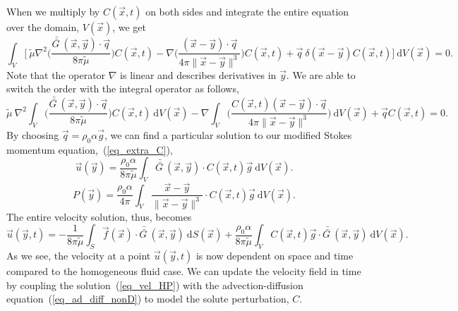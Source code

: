When we multiply by $ C(\vec{x},t) $ on both sides and integrate the entire equation over the domain, $V(\vec{x})$, we get
\begin{equation}
	\int_{V}
	\biggl[
	\ \tilde{\mu} \nabla^2 
	\biggl( \frac{ \bar{\bar{G \ }}(\vec{x}, \vec{y})
	\cdot  \vec{q}}{8\pi \tilde{\mu}}  \biggr)
	C(\vec{x}, t)
	-
	\nabla \biggl( 
	\frac{(\vec{x} - \vec{y}) \cdot  \vec{q} }{4 \pi \| \vec{x} - \vec{y}\|^3}
	\biggr)
	C(\vec{x}, t)
	+ \vec{q} \ \delta \left(\vec{x} - \vec{y} \right)
	C(\vec{x}, t)
	\biggr]
	\ \textrm{d}V(\vec{x}) = 0 .
\label{eq_single_stokes_sub2}
\end{equation}
Note that the operator $\nabla$ is linear and describes derivatives in $\vec{y}$. We are able to switch the order with the integral operator as follows,
\begin{equation}
	\tilde{\mu} \ \nabla^2 
	\int_{V}
	\biggl( \frac{\bar{\bar{G \ }}(\vec{x}, \vec{y})
	\cdot  \vec{q} }{8\pi \tilde{\mu}}  \biggr)
	C(\vec{x}, t)
	\ \textrm{d}V(\vec{x})
	-
	\nabla 
	\int_{V}
	\biggl(
	\frac{	C(\vec{x}, t)(\vec{x} - \vec{y})\cdot  \vec{q} }{4 \pi \| \vec{x} - \vec{y}\|^3} \biggr)
	\ \textrm{d}V(\vec{x})
	+\vec{q} C(\vec{x}, t) = 0 .
\label{eq_single_stokes_sub3}
\end{equation}
By choosing $\vec{q} = \rho_0 \alpha \vec{g}$, we can find a particular solution to our modified Stokes momentum equation,~(\ref{eq_extra_C}),
\begin{equation}
	\vec{u} (\vec{y}) =
	 \frac{\rho_0 \alpha }{8\pi \tilde{\mu}}
	\int_{V}  \bar{\bar{G \ }}(\vec{x}, \vec{y})
	\cdot  C(\vec{x}, t) \vec{g} 
	\ \textrm{d}V(\vec{x}).
\label{eq_fund_soln_unit}
\end{equation}
\begin{equation}
	P(\vec{y}) = 
	\frac{\rho_0 \alpha }{4\pi }  
	\int_{V}
	\frac{\vec{x} - \vec{y}}{\| \vec{x} - \vec{y}\|^3}
	\cdot 
	C(\vec{x}, t) \vec{g} 
	\ \textrm{d}V(\vec{x}).
\label{eq_fund_soln_p}
\end{equation}
The entire velocity solution, thus, becomes
\begin{equation}
	 \vec{u} \left(\vec{y}, t \right) =
	 - \frac{1}{8 \pi \tilde{\mu}} \int_{S}  
		 \vec{f}(\vec{x}) 
		 \cdot \bar{\bar{G \ }} (\vec{x},\vec{y}) 
		 \ \textrm{d}S(\vec{x})
	+ \frac{ \rho_0 \alpha  }{8\pi \tilde{\mu}} \int_V  C \left(\vec{x},  t \right) \vec{g} \cdot 
	\bar{\bar{G \ }}(\vec{x}, \vec{y} ) 
	\ \text{d}V(\vec{x}).
\label{eq_vel_HP}
\end{equation}
As we see, the velocity at a point $\vec{u}(\vec{y},t)$ is now dependent on space and time compared to the homogeneous fluid case. We can update the velocity field in time by coupling the solution~(\ref{eq_vel_HP}) with the advection-diffusion equation~(\ref{eq_ad_diff_nonD}) to model the solute perturbation, $C$.
 
